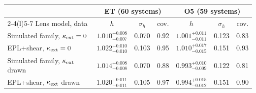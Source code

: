 \begin{tabular*}{\linewidth}{@{\extracolsep{\fill}}lcccccc@{}}
\toprule
 & \multicolumn{3}{c}{ET (60 systems)} & \multicolumn{3}{c}{O5 (59 systems)}\\
\cmidrule(lr){2-4}\cmidrule(l){5-7}
Lens model, data & $h$ & $\sigma_h$ & cov. & $h$ & $\sigma_h$ & cov.\\
\midrule
Simulated family, $\kappa_{\rm ext}=0$ & $1.010^{+0.008}_{-0.007}$ & 0.070 & 0.92 & $1.001^{+0.011}_{-0.011}$ & 0.123 & 0.83\\
EPL+shear, $\kappa_{\rm ext}=0$ & $1.022^{+0.010}_{-0.010}$ & 0.103 & 0.95 & $1.010^{+0.017}_{-0.015}$ & 0.151 & 0.93\\
Simulated family, $\kappa_{\rm ext}$ drawn & $1.014^{+0.008}_{-0.008}$ & 0.070 & 0.88 & $0.993^{+0.010}_{-0.009}$ & 0.122 & 0.81\\
EPL+shear, $\kappa_{\rm ext}$ drawn & $1.020^{+0.011}_{-0.011}$ & 0.105 & 0.97 & $0.994^{+0.015}_{-0.012}$ & 0.151 & 0.90\\
\bottomrule
\end{tabular*}
